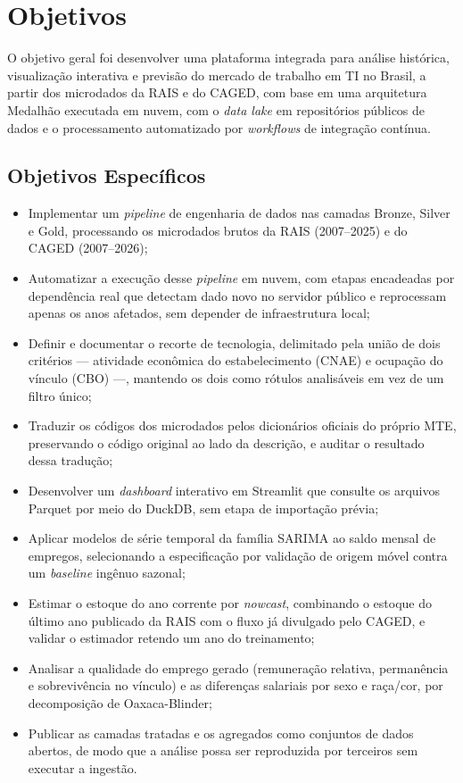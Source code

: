 \section{Objetivos}

O objetivo geral foi desenvolver uma plataforma integrada para análise histórica, visualização interativa e previsão do mercado de trabalho em TI no Brasil, a partir dos microdados da RAIS e do CAGED, com base em uma arquitetura Medalhão executada em nuvem, com o \textit{data lake} em repositórios públicos de dados e o processamento automatizado por \textit{workflows} de integração contínua.

\subsection{Objetivos Específicos}

\begin{itemize}
    \item Implementar um \textit{pipeline} de engenharia de dados nas camadas Bronze, Silver e Gold, processando os microdados brutos da RAIS (2007--2025) e do CAGED (2007--2026);
    \item Automatizar a execução desse \textit{pipeline} em nuvem, com etapas encadeadas por dependência real que detectam dado novo no servidor público e reprocessam apenas os anos afetados, sem depender de infraestrutura local;
    \item Definir e documentar o recorte de tecnologia, delimitado pela união de dois critérios --- atividade econômica do estabelecimento (CNAE) e ocupação do vínculo (CBO) ---, mantendo os dois como rótulos analisáveis em vez de um filtro único;
    \item Traduzir os códigos dos microdados pelos dicionários oficiais do próprio MTE, preservando o código original ao lado da descrição, e auditar o resultado dessa tradução;
    \item Desenvolver um \textit{dashboard} interativo em Streamlit que consulte os arquivos Parquet por meio do DuckDB, sem etapa de importação prévia;
    \item Aplicar modelos de série temporal da família SARIMA ao saldo mensal de empregos, selecionando a especificação por validação de origem móvel contra um \textit{baseline} ingênuo sazonal;
    \item Estimar o estoque do ano corrente por \textit{nowcast}, combinando o estoque do último ano publicado da RAIS com o fluxo já divulgado pelo CAGED, e validar o estimador retendo um ano do treinamento;
    \item Analisar a qualidade do emprego gerado (remuneração relativa, permanência e sobrevivência no vínculo) e as diferenças salariais por sexo e raça/cor, por decomposição de Oaxaca-Blinder;
    \item Publicar as camadas tratadas e os agregados como conjuntos de dados abertos, de modo que a análise possa ser reproduzida por terceiros sem executar a ingestão.
\end{itemize}

